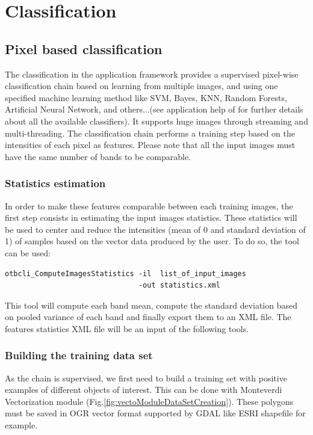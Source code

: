 \section{Classification}\label{sec:classification}

\subsection{Pixel based classification}\label{ssec:pbclassif}

The classification in the application framework provides a supervised pixel-wise
classification chain based on learning from multiple images, and using one 
specified machine learning method like SVM, Bayes, KNN, Random Forests, Artificial 
Neural Network, and others...(see application help of 
 for further details about all the available 
classifiers). It supports huge images through streaming and multi-threading. The 
classification chain performs a training step based on the intensities of each 
pixel as features. Please note that all the input images must have the same number 
of bands to be comparable.

\subsubsection{Statistics estimation}
In order to make these features comparable between each training images, the first 
step consists in estimating the input images statistics. These statistics will be 
used to center and reduce the intensities (mean of 0 and standard deviation of 1) 
of samples based on the vector data produced by the user. To do so, the
 tool can be used:

\begin{verbatim}
otbcli_ComputeImagesStatistics -il  list_of_input_images
                               -out statistics.xml
\end{verbatim}

This tool will compute each band mean, compute the standard deviation based on
pooled variance of each band and finally export them to an XML file.
The features statistics XML file will be an input of the following tools.

\subsubsection{Building the training data set}

As the chain is supervised, we first need to build a training set with
positive examples of different objects of interest. This can be done
with Monteverdi Vectorization module
(Fig.\ref{fig:vectoModuleDataSetCreation}).
These polygons must be saved in OGR vector format supported
by GDAL like ESRI shapefile for example.

